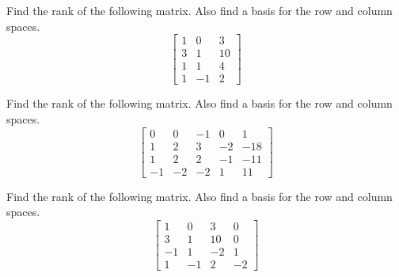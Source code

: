 \documentclass{ximera}
\begin{document}
\begin{problem}\label{prb:5.35} Find the rank of the following matrix. Also find a basis for the row
and column spaces.
\begin{equation*}
\left[
\begin{array}{rrr}
1 & 0 & 3 \\
3 & 1 & 10 \\
1 & 1 & 4 \\
1 & -1 & 2
\end{array}
\right]
\end{equation*}
\end{problem}

\begin{problem}\label{prb:5.36} Find the rank of the following matrix. Also find a basis for the row
and column spaces.
\begin{equation*}
\left[
\begin{array}{rrrrr}
0 & 0 & -1 & 0 & 1 \\
1 & 2 & 3 & -2 & -18 \\
1 & 2 & 2 & -1 & -11 \\
-1 & -2 & -2 & 1 & 11
\end{array}
\right]
\end{equation*}
\end{problem}

\begin{problem}\label{prb:5.37} Find the rank of the following matrix. Also find a basis for the row
and column spaces.
\begin{equation*}
\left[
\begin{array}{rrrr}
1 & 0 & 3 & 0 \\
3 & 1 & 10 & 0 \\
-1 & 1 & -2 & 1 \\
1 & -1 & 2 & -2
\end{array}
\right]
\end{equation*}
\end{problem}
\end{document}
